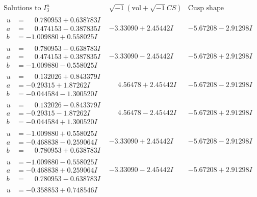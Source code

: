 \documentclass[1p]{elsarticle_modified}
\theoremstyle{definition}
\newcommand{\I}{\sqrt{-1}}
\begin{document}
$$\begin{array}{c|c|c}  
\text{Solutions to }I^u_{3}& \I (\text{vol} + \sqrt{-1}CS) & \text{Cusp shape}\\
 \hline 
\begin{aligned}
u &= \phantom{-}0.780953 + 0.638783 I \\
a &= \phantom{-}0.474153 - 0.387835 I \\
b &= -1.009880 + 0.558025 I\end{aligned}
 & -3.33090 + 2.45442 I & -5.67208 - 2.91298 I \\ \hline\begin{aligned}
u &= \phantom{-}0.780953 - 0.638783 I \\
a &= \phantom{-}0.474153 + 0.387835 I \\
b &= -1.009880 - 0.558025 I\end{aligned}
 & -3.33090 - 2.45442 I & -5.67208 + 2.91298 I \\ \hline\begin{aligned}
u &= \phantom{-}0.132026 + 0.843379 I \\
a &= -0.29315 + 1.87262 I \\
b &= -0.044584 - 1.300520 I\end{aligned}
 & \phantom{-}4.56478 + 2.45442 I & -5.67208 - 2.91298 I \\ \hline\begin{aligned}
u &= \phantom{-}0.132026 - 0.843379 I \\
a &= -0.29315 - 1.87262 I \\
b &= -0.044584 + 1.300520 I\end{aligned}
 & \phantom{-}4.56478 - 2.45442 I & -5.67208 + 2.91298 I \\ \hline\begin{aligned}
u &= -1.009880 + 0.558025 I \\
a &= -0.468838 - 0.259064 I \\
b &= \phantom{-}0.780953 + 0.638783 I\end{aligned}
 & -3.33090 + 2.45442 I & -5.67208 - 2.91298 I \\ \hline\begin{aligned}
u &= -1.009880 - 0.558025 I \\
a &= -0.468838 + 0.259064 I \\
b &= \phantom{-}0.780953 - 0.638783 I\end{aligned}
 & -3.33090 - 2.45442 I & -5.67208 + 2.91298 I \\ \hline\begin{aligned}
u &= -0.358853 + 0.748546 I \\

\end{aligned}
\end{array}$$
\end{document}
